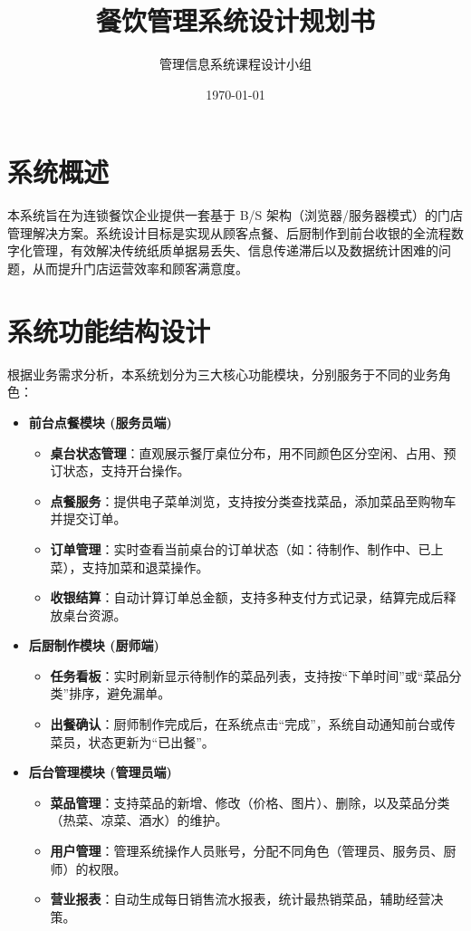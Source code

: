 \documentclass[11pt, a4paper]{article}
\title{\textbf{餐饮管理系统设计规划书}}
\author{管理信息系统课程设计小组}
\date{\today}
\begin{document}
\maketitle

\tableofcontents
\newpage

\section{系统概述}
本系统旨在为连锁餐饮企业提供一套基于 B/S 架构（浏览器/服务器模式）的门店管理解决方案。系统设计目标是实现从顾客点餐、后厨制作到前台收银的全流程数字化管理，有效解决传统纸质单据易丢失、信息传递滞后以及数据统计困难的问题，从而提升门店运营效率和顾客满意度。

\section{系统功能结构设计}
根据业务需求分析，本系统划分为三大核心功能模块，分别服务于不同的业务角色：

\begin{itemize}
    \item \textbf{前台点餐模块 (服务员端)}
    \begin{itemize}
        \item \textbf{桌台状态管理}：直观展示餐厅桌位分布，用不同颜色区分空闲、占用、预订状态，支持开台操作。
        \item \textbf{点餐服务}：提供电子菜单浏览，支持按分类查找菜品，添加菜品至购物车并提交订单。
        \item \textbf{订单管理}：实时查看当前桌台的订单状态（如：待制作、制作中、已上菜），支持加菜和退菜操作。
        \item \textbf{收银结算}：自动计算订单总金额，支持多种支付方式记录，结算完成后释放桌台资源。
    \end{itemize}
    
    \item \textbf{后厨制作模块 (厨师端)}
    \begin{itemize}
        \item \textbf{任务看板}：实时刷新显示待制作的菜品列表，支持按“下单时间”或“菜品分类”排序，避免漏单。
        \item \textbf{出餐确认}：厨师制作完成后，在系统点击“完成”，系统自动通知前台或传菜员，状态更新为“已出餐”。
    \end{itemize}
    
    \item \textbf{后台管理模块 (管理员端)}
    \begin{itemize}
        \item \textbf{菜品管理}：支持菜品的新增、修改（价格、图片）、删除，以及菜品分类（热菜、凉菜、酒水）的维护。
        \item \textbf{用户管理}：管理系统操作人员账号，分配不同角色（管理员、服务员、厨师）的权限。
        \item \textbf{营业报表}：自动生成每日销售流水报表，统计最热销菜品，辅助经营决策。
    \end{itemize}
\end{itemize}
\end{document}
